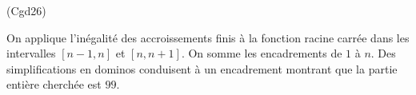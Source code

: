 \begin{tiny}(Cgd26)\end{tiny} On applique l'inégalité des accroissements finis à la fonction racine carrée dans les intervalles $[n-1,n]$ et $[n,n+1]$. On somme les encadrements de $1$ à $n$. Des simplifications en dominos conduisent à un encadrement montrant que la partie entière cherchée est $99$. 